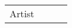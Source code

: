 \begin{tabular}{llll}
Artist           &                                                                                                                                                                                                                                                                                                                                                                                                                                                                                                                                                                                                                                                                                                                                                                                                                                                                                                                                                                                                                                                                             &                                                                                                                                                                                                                                                                                                                                                                                                                                                                                                                                                                                                                                                                                                                                                                                                                                                                                                                                                                                                                                                                            &                                                                                                                                                                                                                                                                                                                                                                                                                                                                                                                                                                                                                                                                                                                                                                                                                                                                                                                                                                                                                                                                            \\

\end{tabular}
